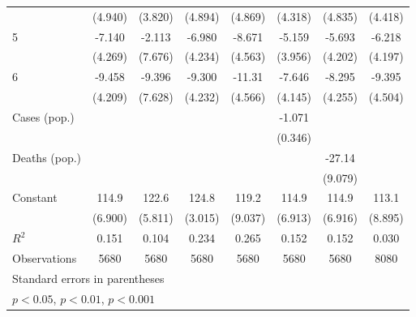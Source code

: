 \documentclass{article}
\begin{document}
{\begin{longtable}{l*{7}{c}}
                &  (4.940)         &  (3.820)         &  (4.894)         &  (4.869)         &  (4.318)         &  (4.835)         &  (4.418)         \\
5               &   -7.140         &   -2.113         &   -6.980         &   -8.671         &   -5.159         &   -5.693         &   -6.218         \\
                &  (4.269)         &  (7.676)         &  (4.234)         &  (4.563)         &  (3.956)         &  (4.202)         &  (4.197)         \\
6               &   -9.458\sym{*}  &   -9.396         &   -9.300\sym{*}  &   -11.31\sym{*}  &   -7.646         &   -8.295         &   -9.395\sym{*}  \\
                &  (4.209)         &  (7.628)         &  (4.232)         &  (4.566)         &  (4.145)         &  (4.255)         &  (4.504)         \\
Cases (pop.)    &                  &                  &                  &                  &   -1.071\sym{**} &                  &                  \\
                &                  &                  &                  &                  &  (0.346)         &                  &                  \\
Deaths (pop.)   &                  &                  &                  &                  &                  &   -27.14\sym{**} &                  \\
                &                  &                  &                  &                  &                  &  (9.079)         &                  \\
Constant        &    114.9\sym{***}&    122.6\sym{***}&    124.8\sym{***}&    119.2\sym{***}&    114.9\sym{***}&    114.9\sym{***}&    113.1\sym{***}\\
                &  (6.900)         &  (5.811)         &  (3.015)         &  (9.037)         &  (6.913)         &  (6.916)         &  (8.895)         \\
\hline
\(R^{2}\)       &    0.151         &    0.104         &    0.234         &    0.265         &    0.152         &    0.152         &    0.030         \\
Observations    &     5680         &     5680         &     5680         &     5680         &     5680         &     5680         &     8080         \\
\hline\hline
\multicolumn{8}{l}{\footnotesize Standard errors in parentheses}\\
\multicolumn{8}{l}{\footnotesize \sym{*} \(p<0.05\), \sym{**} \(p<0.01\), \sym{***} \(p<0.001\)}\\
\end{longtable}
}
\end{document}
